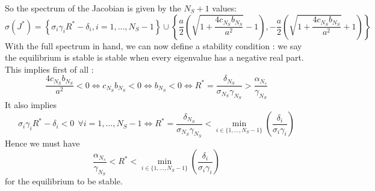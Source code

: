 \documentclass[12pt, titlepage]{report}
\begin{document}
	So the spectrum of the Jacobian is given by the $N_S+1$ values:
	\begin{equation}
		\sigma(J^*) = \left\{\sigma_i \gamma_i R^*-\delta_i, i=1,..., N_S-1\right\} \cup \left\{\frac{a}{2}\left(\sqrt{1+\frac{4c_{N_S} b_{N_S}}{a^2}}-1\right), -\frac{a}{2}\left(\sqrt{1+\frac{4c_{N_S} b_{N_S}}{a^2}}+1\right)\right\}
	\end{equation}
	With the full spectrum in hand, we can now define a stability condition : we say the equilibrium is stable is stable when every eigenvalue has a negative real part.
	This implies first of all :
	\begin{equation}
		\frac{4 c_{N_S} b_{N_S}}{a^2} < 0 \iff c_{N_S} b_{N_S} < 0 \iff b_{N_S} < 0 \iff R^* = \frac{\delta_{N_S}}{\sigma_{N_S}\gamma_{N_S}} > \frac{\alpha_{N_s}}{\gamma_{N_S}}
	\end{equation}
	It also implies
	\begin{equation}
		\sigma_i \gamma_i R^* - \delta_i < 0 \ \ \forall i = 1, \dots, N_S-1 \iff R^* = \frac{\delta_{N_S}}{\sigma_{N_S}\gamma_{N_S}} < \min_{i \in \{1, \dots, N_S-1\}}\left(\frac{\delta_i}{\sigma_i \gamma_{i}} \right)
	\end{equation}
	Hence we must have
	\begin{equation}
		\boxed{ \frac{\alpha_{N_s}}{\gamma_{N_S}} < R^* < \min_{i \in \{1, \dots, N_S-1\}}\left(\frac{\delta_i}{\sigma_i \gamma_{i}}\right)}
	\end{equation}
	for the equilibrium to be stable.
\end{document}
